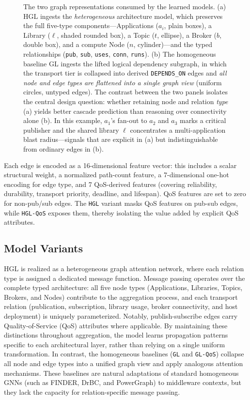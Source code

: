\documentclass[sigconf,9pt,anonymous]{acmart}
\begin{document}
\begin{figure}[t]
\caption{The two graph representations consumed by the learned models. (a) HGL ingests the \emph{heterogeneous} architecture model, which preserves the full five-type components---Applications ($a_i$, plain boxes), a Library ($\ell$, shaded rounded box), a Topic ($t$, ellipse), a Broker ($b$, double box), and a compute Node ($n$, cylinder)---and the typed relationships (\texttt{pub}, \texttt{sub}, \texttt{uses}, \texttt{conn}, \texttt{runs}). (b) The homogeneous baseline GL ingests the lifted logical dependency subgraph, in which the transport tier is collapsed into derived \texttt{DEPENDS\_ON} edges and \emph{all node and edge types are flattened into a single graph view} (uniform circles, untyped edges). The contrast between the two panels isolates the central design question: whether retaining node and relation \emph{type} (a) yields better cascade prediction than reasoning over connectivity alone (b). In this example, $a_1$'s fan-out to $a_2$ and $a_3$ marks a critical publisher and the shared library $\ell$ concentrates a multi-application blast radius---signals that are explicit in (a) but indistinguishable from ordinary edges in (b).}
\label{fig:hetero-graph}
\end{figure}

Each edge is encoded as a 16-dimensional feature vector: this includes a scalar structural weight, a normalized path-count feature, a 7-dimensional one-hot encoding for edge type, and 7 QoS-derived features (covering reliability, durability, transport priority, deadline, and lifespan). QoS features are set to zero for non-pub/sub edges. The \texttt{HGL} variant masks QoS features on pub-sub edges, while \texttt{HGL-QoS} exposes them, thereby isolating the value added by explicit QoS attributes.

\subsection{Model Variants}

HGL is realized as a heterogeneous graph attention network, where each relation type is assigned a dedicated message function. Message passing operates over the complete typed architecture: all five node types (Applications, Libraries, Topics, Brokers, and Nodes) contribute to the aggregation process, and each transport relation (publication, subscription, library usage, broker connectivity, and host deployment) is uniquely parameterized. Notably, publish-subscribe edges carry Quality-of-Service (QoS) attributes where applicable. By maintaining these distinctions throughout aggregation, the model learns propagation patterns specific to each architectural layer, rather than relying on a single uniform transformation. In contrast, the homogeneous baselines (\texttt{GL} and \texttt{GL-QoS}) collapse all node and edge types into a unified graph view and apply analogous attention mechanisms. These baselines are natural adaptations of standard homogeneous GNNs (such as FINDER, DrBC, and PowerGraph) to middleware contexts, but they lack the capacity for relation-specific message passing.
\end{document}
